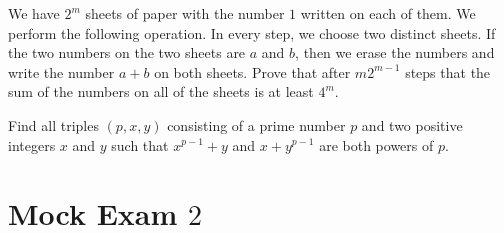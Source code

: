 \documentclass{subfile}
\begin{document}
	\begin{problem}
		We have $2^m$ sheets of paper with the number $1$ written on each of them. We perform the following operation. In every step, we choose two distinct sheets. If the two numbers on the two sheets are $a$ and $b$, then we erase the numbers and write the number $a+b$ on both sheets. Prove that after $m2^{m-1}$ steps that the sum of the numbers on all of the sheets is at least $4^m$.
	\end{problem}
	
	\begin{problem}
		Find all triples $(p, x, y)$ consisting of a prime number $p$ and two positive integers $x$ and $y$ such that
		$x^{p-1} + y$ and $x + y^{p-1}$ are both powers of $p$.
	\end{problem}
	\newpage
	
	\section{Mock Exam $2$}
	
\end{document}
